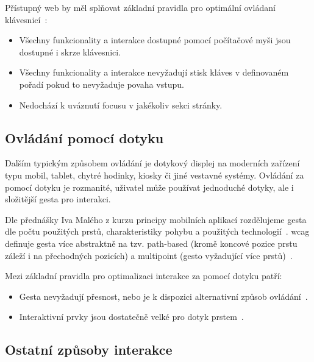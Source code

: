 Přístupný web by měl splňovat základní pravidla pro optimální ovládaní klávesnicí~\cite{wcag-keyboard}:

\begin{itemize}
    \item Všechny funkcionality a interakce dostupné pomocí počítačové myši jsou dostupné i skrze klávesnici.
    \item Všechny funkcionality a interakce nevyžadují stisk kláves v definovaném pořadí pokud to nevyžaduje povaha vstupu.
    \item Nedochází k uváznutí focusu v jakékoliv sekci stránky.
\end{itemize}

\subsection{Ovládání pomocí dotyku}

Dalším typickým způsobem ovládání je dotykový displej na moderních zařízení typu mobil, tablet, chytré hodinky, kiosky či jiné vestavné systémy.
Ovládání za pomocí dotyku je rozmanité, uživatel může používat jednoduché dotyky, ale i složitější gesta pro interakci.


Dle přednášky Iva Malého z kurzu principy mobilních aplikací rozdělujeme gesta dle počtu použitých prstů, charakteristiky pohybu a použitých technologií~\cite{ctu-pda-11}.
\gls{wcag} definuje gesta více abstraktně na tzv. path-based (kromě koncové pozice prstu záleží i na přechodných pozicích) a multipoint (gesto vyžadující více prstů)~\cite{wcag-pointer-gestures}.

Mezi základní pravidla pro optimalizaci interakce za pomocí dotyku patří:

\begin{itemize}
    \item Gesta nevyžadují přesnost, nebo je k dispozici alternativní způsob ovládání~\cite{wcag-pointer-gestures}.
    \item Interaktivní prvky jsou dostatečně velké pro dotyk prstem~\cite{wcag-target-size}.
\end{itemize}

\subsection{Ostatní způsoby interakce}


